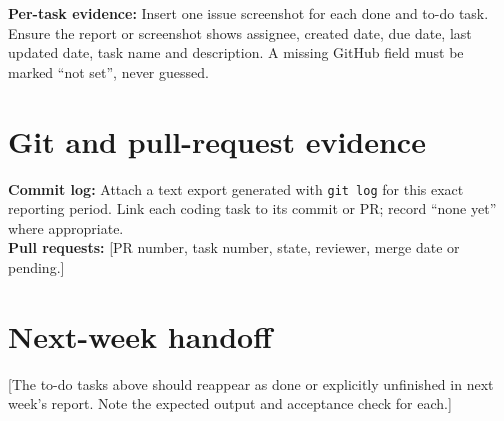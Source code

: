 \textbf{Per-task evidence:} Insert one issue screenshot for each done and to-do task. Ensure the report or screenshot shows assignee, created date, due date, last updated date, task name and description. A missing GitHub field must be marked ``not set'', never guessed.

\section{Git and pull-request evidence}
\textbf{Commit log:} Attach a text export generated with \texttt{git log} for this exact reporting period. Link each coding task to its commit or PR; record ``none yet'' where appropriate.\\
\textbf{Pull requests:} [PR number, task number, state, reviewer, merge date or pending.]

\section{Next-week handoff}
[The to-do tasks above should reappear as done or explicitly unfinished in next week's report. Note the expected output and acceptance check for each.]


